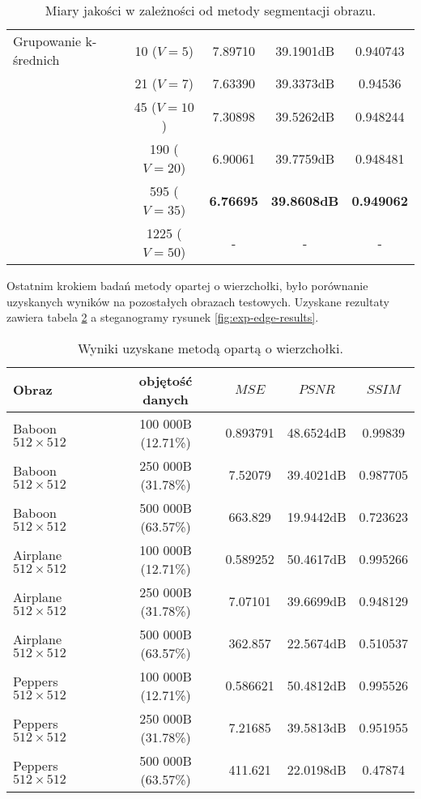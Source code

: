 {\begin{table}
\begin{tabular}{ |l|c|c c c| }
            \hline
            Grupowanie k-średnich & 10   ($V=5$)  & 7.89710 & 39.1901dB & 0.940743 \\
                                  & 21   ($V=7$)  & 7.63390 & 39.3373dB & 0.94536 \\
                                  & 45   ($V=10$) & 7.30898 & 39.5262dB & 0.948244 \\
                                  & 190  ($V=20$) & 6.90061 & 39.7759dB & 0.948481 \\
                                  & 595  ($V=35$) & \textbf{6.76695} & \textbf{39.8608dB} & \textbf{0.949062} \\
                                  & 1225 ($V=50$) & - & - & - \\
            \hline
        \end{tabular}
        \caption{Miary jakości w zależności od metody segmentacji obrazu.}
        \label{tab:exp-edge-results}
    \end{table}

    Ostatnim krokiem badań metody opartej o wierzchołki, było porównanie uzyskanych wyników na pozostałych obrazach
    testowych. Uzyskane rezultaty zawiera tabela \ref{tab:exp-edge-results} a steganogramy rysunek
    \ref{fig:exp-edge-results}.

    \begin{table}
        \centering
        \begin{tabular}{ |l|c|c c c| }
            \hline
            Obraz & objętość danych & $MSE$ & $PSNR$ & $SSIM$ \\
            \hline
            Baboon {\footnotesize $512 \times 512$}   & 100 000B (12.71\%) & 0.893791 & 48.6524dB & 0.99839 \\
            Baboon {\footnotesize $512 \times 512$}   & 250 000B (31.78\%) & 7.52079 & 39.4021dB & 0.987705 \\
            Baboon {\footnotesize $512 \times 512$}   & 500 000B (63.57\%) & 663.829 & 19.9442dB & 0.723623 \\
            Airplane {\footnotesize $512 \times 512$} & 100 000B (12.71\%) & 0.589252 & 50.4617dB & 0.995266 \\
            Airplane {\footnotesize $512 \times 512$} & 250 000B (31.78\%) & 7.07101 & 39.6699dB & 0.948129 \\
            Airplane {\footnotesize $512 \times 512$} & 500 000B (63.57\%) & 362.857 & 22.5674dB & 0.510537 \\
            Peppers {\footnotesize $512 \times 512$}  & 100 000B (12.71\%) & 0.586621 & 50.4812dB & 0.995526 \\
            Peppers {\footnotesize $512 \times 512$}  & 250 000B (31.78\%) & 7.21685 & 39.5813dB & 0.951955 \\
            Peppers {\footnotesize $512 \times 512$}  & 500 000B (63.57\%) & 411.621 & 22.0198dB & 0.47874 \\
            \hline
        \end{tabular}
        \caption{Wyniki uzyskane metodą opartą o wierzchołki.}
        \label{tab:exp-edge-results}
    \end{table}

}
